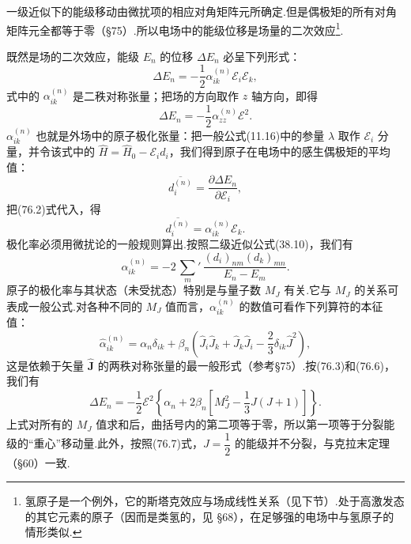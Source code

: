 一级近似下的能级移动由微扰项的相应对角矩阵元所确定.但是偶极矩的所有对角矩阵元全都等于零（§75）.所以电场中的能级位移是场量的二次效应\footnote{氢原子是一个例外，它的斯塔克效应与场成线性关系（见下节）.处于高激发态的其它元素的原子（因而是类氢的，见 §68），在足够强的电场中与氢原子的情形类似.}.

既然是场的二次效应，能级 $E_n$ 的位移 $\Delta E_n$ 必呈下列形式：
\begin{equation}
  \Delta E_n=-\frac{1}{2}\alpha_{ik}^{(n)}\mathcal{E}_i\mathcal{E}_k,
\end{equation}
式中的 $\alpha_{ik}^{(n)}$ 是二秩对称张量；把场的方向取作 $z$ 轴方向，即得
\begin{equation}
  \Delta E_n=-\frac{1}{2}\alpha_{zz}^{(n)}\mathcal{E}^{2}.
\end{equation}
$\alpha_{ik}^{(n)}$ 也就是外场中的原子极化张量：把一般公式(11.16)中的参量 $\lambda$ 取作 $\mathcal{E}_i$ 分量，并令该式中的 $\hat{H}=\hat{H}_0-\mathcal{E}_id_i$，我们得到原子在电场中的感生偶极矩的平均值：
\begin{equation*}
  \overline{d_i^{(n)}}=\frac{\partial\Delta E_n}{\partial\mathcal{E}_i},
\end{equation*}
把(76.2)式代入，得
\begin{equation}
  \overline{d_i^{(n)}}=\alpha_{ik}^{(n)}\mathcal{E}_k.
\end{equation}
极化率必须用微扰论的一般规则算出.按照二级近似公式(38.10)，我们有
\begin{equation}
  \alpha_{ik}^{(n)}=-2\,{\sum_m}'\,
  \frac{(d_i)_{nm}(d_k)_{mn}}{E_n-E_m}.
\end{equation}
原子的极化率与其状态（未受扰态）特别是与量子数 $M_J$ 有关.它与 $M_J$ 的关系可表成一般公式.对各种不同的 $M_J$ 值而言，$\alpha_{ik}^{(n)}$ 的数值可看作下列算符的本征值：
\begin{equation}
  \hat{\alpha}_{ik}^{(n)}=\alpha_n\delta_{ik}
  +\beta_n\left(\hat{J}_i\hat{J}_k+\hat{J}_k\hat{J}_i-\frac{2}{3}\delta_{ik}\hat{J}^{2}\right),
\end{equation}
这是依赖于矢量 $\hat{\boldsymbol{J}}$ 的两秩对称张量的最一般形式（参考§75）.按(76.3)和(76.6)，我们有
\begin{equation}
  \Delta E_n=-\frac{1}{2}\mathcal{E}^{2}
  \left\{\alpha_n+2\beta_n\left[M_J^{2}-\frac{1}{3}J(J+1)\right]\right\}.
\end{equation}
上式对所有的 $M_J$ 值求和后，曲括号内的第二项等于零，所以第一项等于分裂能级的“重心”移动量.此外，按照(76.7)式，$J=\dfrac{1}{2}$ 的能级并不分裂，与克拉末定理（§60）一致.

